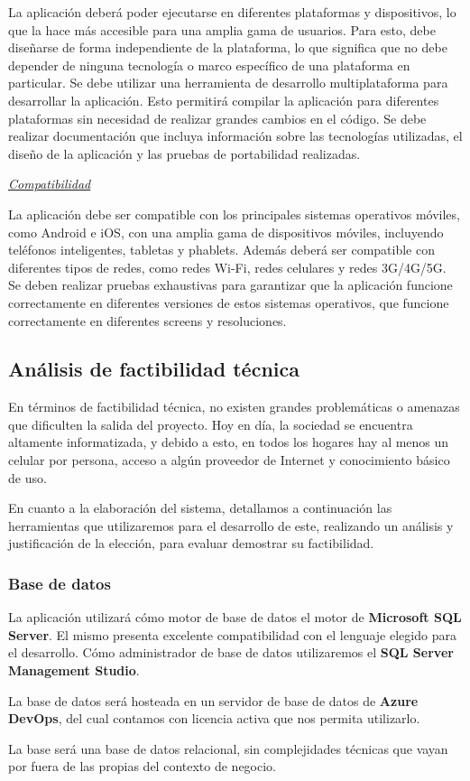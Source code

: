 \documentclass[a4paper,12pt]{article}
\begin{document}
    \newline
    \par La aplicación deberá poder ejecutarse en diferentes plataformas y dispositivos, lo que la hace más accesible para una amplia gama de usuarios. Para esto, debe diseñarse de forma independiente de la plataforma, lo que significa que no debe depender de ninguna tecnología o marco específico de una plataforma en particular. Se debe utilizar una herramienta de desarrollo multiplataforma para desarrollar la aplicación. Esto permitirá compilar la aplicación para diferentes plataformas sin necesidad de realizar grandes cambios en el código. Se debe realizar documentación que incluya información sobre las tecnologías utilizadas, el diseño de la aplicación y las pruebas de portabilidad realizadas.
    \newline
    \par \noindent \textit{\underline{Compatibilidad}} 
    \newline
    \par La aplicación debe ser compatible con los principales sistemas operativos móviles, como Android e iOS, con una amplia gama de dispositivos móviles, incluyendo teléfonos inteligentes, tabletas y phablets. Además deberá ser compatible con diferentes tipos de redes, como redes Wi-Fi, redes celulares y redes 3G/4G/5G. Se deben realizar pruebas exhaustivas para garantizar que la aplicación funcione correctamente en diferentes versiones de estos sistemas operativos, que funcione correctamente en diferentes screens y resoluciones.
    \subsection{Análisis de factibilidad técnica}
    \par En términos de factibilidad técnica, no existen grandes problemáticas o amenazas que dificulten la salida del proyecto. Hoy en día, la sociedad se encuentra altamente informatizada, y debido a esto, en todos los hogares hay al menos un celular por persona, acceso a algún proveedor de Internet y conocimiento básico de uso.
    \par En cuanto a la elaboración del sistema, detallamos a continuación las herramientas que utilizaremos para el desarrollo de este, realizando un análisis y justificación de la elección, para evaluar demostrar su factibilidad.
    \subsubsection{Base de datos}
    \par La aplicación utilizará cómo motor de base de datos el motor de \textbf{Microsoft SQL Server}. El mismo presenta excelente compatibilidad con el lenguaje elegido para el desarrollo. Cómo administrador de base de datos utilizaremos el \textbf{SQL Server Management Studio}.
    \par La base de datos será hosteada en un servidor de base de datos de \textbf{Azure DevOps}, del cual contamos con licencia activa que nos permita utilizarlo.
    \par La base será una base de datos relacional, sin complejidades técnicas que vayan por fuera de las propias del contexto de negocio.
\end{document}
